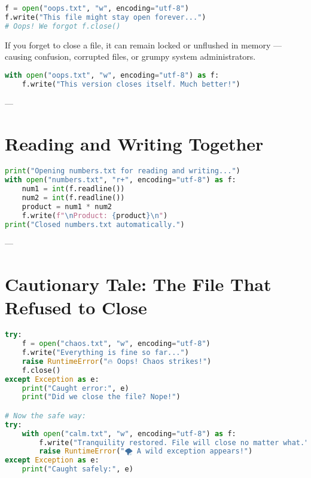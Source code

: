 \begin{lstlisting}[language=Python, caption={Manual open and close -- easy to forget.}]
f = open("oops.txt", "w", encoding="utf-8")
f.write("This file might stay open forever...")
# Oops! We forgot f.close()
\end{lstlisting}

\noindent
If you forget to close a file, it can remain locked or unflushed in memory —  
causing confusion, corrupted files, or grumpy system administrators.  

\begin{lstlisting}[language=Python, caption={Fixed using a with statement.}]
with open("oops.txt", "w", encoding="utf-8") as f:
    f.write("This version closes itself. Much better!")
\end{lstlisting}

---

\section{Reading and Writing Together}

\begin{lstlisting}[language=Python, caption={Using the same file object for reading and writing.}]
print("Opening numbers.txt for reading and writing...")
with open("numbers.txt", "r+", encoding="utf-8") as f:
    num1 = int(f.readline())
    num2 = int(f.readline())
    product = num1 * num2
    f.write(f"\nProduct: {product}\n")
print("Closed numbers.txt automatically.")
\end{lstlisting}

---

\section{Cautionary Tale: The File That Refused to Close}

\begin{lstlisting}[language=Python, caption={Why with is safer.}]
try:
    f = open("chaos.txt", "w", encoding="utf-8")
    f.write("Everything is fine so far...")
    raise RuntimeError("🔥 Oops! Chaos strikes!")
    f.close()
except Exception as e:
    print("Caught error:", e)
    print("Did we close the file? Nope!")

# Now the safe way:
try:
    with open("calm.txt", "w", encoding="utf-8") as f:
        f.write("Tranquility restored. File will close no matter what.")
        raise RuntimeError("🌪 A wild exception appears!")
except Exception as e:
    print("Caught safely:", e)
\end{lstlisting}

